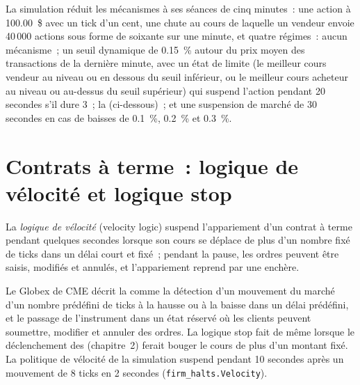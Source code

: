 La simulation réduit les mécanismes à ses séances de cinq minutes~: une action à 100.00~\$ avec un tick d'un cent, une chute au cours de laquelle un vendeur envoie
40\,000 actions sous forme de soixante  sur une minute, et quatre régimes~: aucun mécanisme~; un seuil dynamique de 0.15~\% autour du prix moyen des
transactions de la dernière minute, avec un état de limite (le meilleur cours vendeur au niveau ou en dessous du seuil inférieur, ou le meilleur cours acheteur au niveau ou au-dessus du seuil supérieur) qui suspend l'action pendant 20 secondes s'il
dure 3~; la  (ci-dessous)~; et une suspension de marché de 30 secondes en cas de baisses de 0.1~\%, 0.2~\% et 0.3~\%.

\section{Contrats à terme~: logique de vélocité et logique stop}

\begin{definition}\label{def:mx:circuit-breakers-and-halts:velocity}
La \emph{logique de vélocité} (velocity logic) suspend l'appariement d'un contrat à terme pendant quelques secondes lorsque son cours se déplace de plus d'un nombre fixé de
ticks dans un délai court et fixé~; pendant la pause, les ordres peuvent être saisis, modifiés et annulés, et l'appariement reprend par une enchère.
\end{definition}

Le Globex de CME décrit la  comme la détection d'un mouvement du marché d'un nombre prédéfini de ticks à la hausse ou à la baisse dans un délai prédéfini, et le
passage de l'instrument dans un état réservé où les clients peuvent soumettre, modifier et annuler des ordres. La logique stop fait de même lorsque le déclenchement des  (chapitre~2)
ferait bouger le cours de plus d'un montant fixé. La politique de vélocité de la simulation suspend pendant 10 secondes après un mouvement de 8 ticks en 2
secondes (\texttt{firm\_halts.Velocity}).

